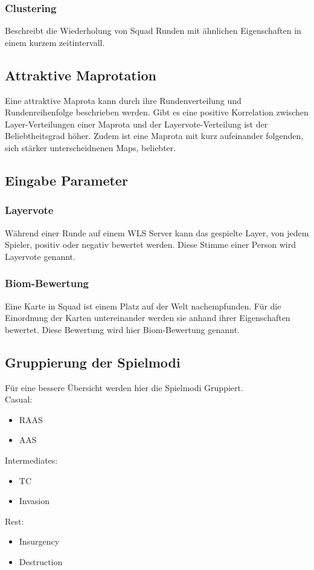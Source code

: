 \documentclass[a4paper, 11pt]{scrartcl}
\begin{document}
            \subsubsection{Clustering}
                Beschreibt die Wiederholung von Squad Runden mit ähnlichen Eigenschaften in einem kurzem zeitintervall.
            \subsection{Attraktive Maprotation}
                Eine attraktive Maprota kann durch ihre Rundenverteilung und Rundenreihenfolge beschrieben werden.
                Gibt es eine positive Korrelation zwischen Layer-Verteilungen einer Maprota und der Layervote-Verteilung ist der Beliebtheitsgrad höher.
                Zudem ist eine Maprota mit kurz aufeinander folgenden, sich stärker unterscheidnenen Maps, beliebter.
        \subsection{Eingabe Parameter}
            \subsubsection{Layervote}
                Während einer Runde auf einem WLS Server kann das gespielte Layer, von jedem Spieler,
                positiv oder negativ bewertet werden.
                Diese Stimme einer Person wird Layervote genannt.
            \subsubsection{Biom-Bewertung}
                Eine Karte in Squad ist einem Platz auf der Welt nachempfunden. 
                Für die Einordnung der Karten untereinander werden sie anhand ihrer Eigenschaften bewertet.
                Diese Bewertung wird hier Biom-Bewertung genannt.
        \subsection{Gruppierung der Spielmodi}
                Für eine bessere Übersicht werden hier die Spielmodi Gruppiert.\\
                Casual:
                \begin{itemize}
                    \item RAAS
                    \item AAS
                \end{itemize}
                Intermediates:
                \begin{itemize}
                    \item TC
                    \item Invasion
                \end{itemize}
                Rest:
                \begin{itemize}
                    \item Insurgency
                    \item Destruction 
                \end{itemize}
    
\end{document}

